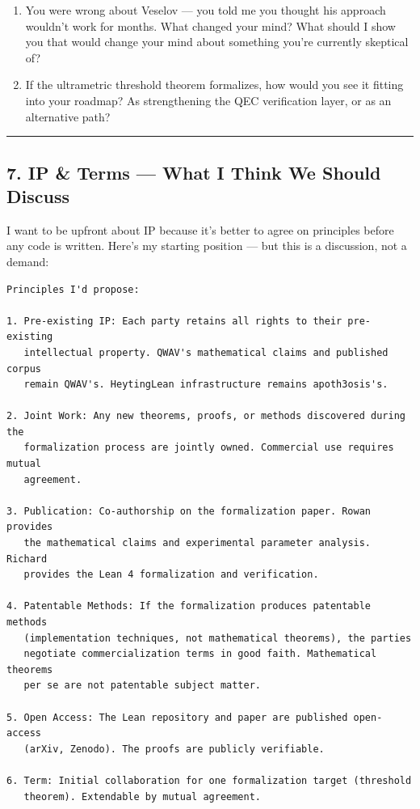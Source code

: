 \documentclass[11pt,a4paper]{article}
\begin{document}
\begin{enumerate}[nosep]
\item You were wrong about Veselov — you told me you thought his approach wouldn't work for months. What changed your mind? What should I show you that would change your mind about something you're currently skeptical of?
\item If the ultrametric threshold theorem formalizes, how would you see it fitting into your roadmap? As strengthening the QEC verification layer, or as an alternative path?
\end{enumerate}

\bigskip
\noindent\rule{\textwidth}{0.4pt}
\bigskip
\subsection*{7. IP \& Terms — What I Think We Should Discuss}

I want to be upfront about IP because it's better to agree on principles before any code is written. Here's my starting position — but this is a discussion, not a demand:

\begin{verbatim}
Principles I'd propose:

1. Pre-existing IP: Each party retains all rights to their pre-existing
   intellectual property. QWAV's mathematical claims and published corpus
   remain QWAV's. HeytingLean infrastructure remains apoth3osis's.

2. Joint Work: Any new theorems, proofs, or methods discovered during the
   formalization process are jointly owned. Commercial use requires mutual
   agreement.

3. Publication: Co-authorship on the formalization paper. Rowan provides
   the mathematical claims and experimental parameter analysis. Richard
   provides the Lean 4 formalization and verification.

4. Patentable Methods: If the formalization produces patentable methods
   (implementation techniques, not mathematical theorems), the parties
   negotiate commercialization terms in good faith. Mathematical theorems
   per se are not patentable subject matter.

5. Open Access: The Lean repository and paper are published open-access
   (arXiv, Zenodo). The proofs are publicly verifiable.

6. Term: Initial collaboration for one formalization target (threshold
   theorem). Extendable by mutual agreement.
\end{verbatim}
\end{document}
